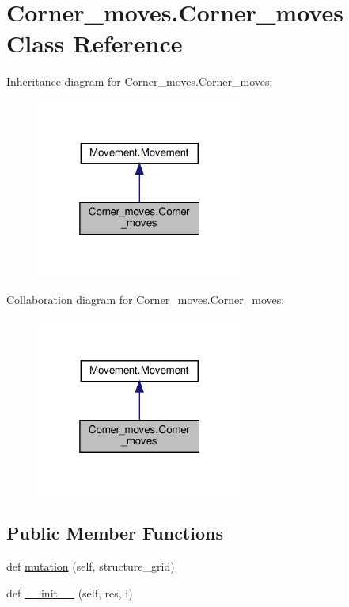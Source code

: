 \hypertarget{classCorner__moves_1_1Corner__moves}{}\section{Corner\+\_\+moves.\+Corner\+\_\+moves Class Reference}
\label{classCorner__moves_1_1Corner__moves}


Inheritance diagram for Corner\+\_\+moves.\+Corner\+\_\+moves\+:
\nopagebreak
\begin{figure}[H]
\begin{center}
\leavevmode
\includegraphics[width=193pt]{classCorner__moves_1_1Corner__moves__inherit__graph}
\end{center}
\end{figure}


Collaboration diagram for Corner\+\_\+moves.\+Corner\+\_\+moves\+:
\nopagebreak
\begin{figure}[H]
\begin{center}
\leavevmode
\includegraphics[width=193pt]{classCorner__moves_1_1Corner__moves__coll__graph}
\end{center}
\end{figure}
\subsection*{Public Member Functions}
\begin{DoxyCompactItemize}
\item 
def \hyperlink{classCorner__moves_1_1Corner__moves_aa6b7b51aa871e3b5c2cdc5ed14fe5706}{mutation} (self, structure\+\_\+grid)
\item 
def \hyperlink{classCorner__moves_1_1Corner__moves_af74a6a204959ce19e1f9a10a8b4c8000}{\+\_\+\+\_\+init\+\_\+\+\_\+} (self, res, i)
\end{DoxyCompactItemize}
